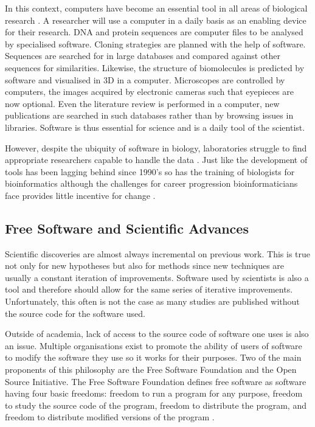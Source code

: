   In this context, computers have become an
  essential tool in all areas of biological research
  \citep{wren2016bioinformatics}.
  A researcher will use a computer in a daily
  basis as an enabling device for their research.
  DNA and protein sequences are computer files to be analysed by specialised
  software.  Cloning strategies are planned with the help of software.
  Sequences are searched for in large databases and compared against other
  sequences for similarities.
  Likewise, the structure of biomolecules is predicted by software and
  visualised in 3D in a computer.  Microscopes are controlled by
  computers, the images acquired by electronic cameras such that
  eyepieces are now optional.  Even
  the literature review is performed in a computer, new publications
  are searched in such databases rather than
  by browsing issues in libraries.  Software is
  thus essential for science and is a daily tool of the scientist.

  However, despite the ubiquity of software in biology, laboratories
  struggle to find appropriate researchers capable to handle the data
  \citep{lakhani2013prize}.  Just like the development of tools has
  been lagging behind since 1990's so has the training of biologists
  for bioinformatics \citep{altman1998curriculum} although the
  challenges for career progression bioinformaticians face provides
  little incentive for change \citep{wren2016bioinformatics}.

  \subsection{Free Software and Scientific Advances}

  Scientific discoveries are almost always incremental on previous work.
  This is true not only for new hypotheses but also
  for methods since new techniques are usually
  a constant iteration of improvements.  Software used by
  scientists is also a tool and therefore should allow for the same
  series of iterative improvements.
  Unfortunately, this often is not the case as
  many studies are published without the source code for the software used.

  Outside of academia, lack of access to the source code of software
  one uses is also an issue.
  Multiple organisations exist to promote the ability of users of software
  to modify the software they use so it works for their
  purposes.  Two of the main proponents of this philosophy
  are the Free Software Foundation and the
  Open Source Initiative.  The Free Software Foundation defines free
  software as software having four basic freedoms: freedom to run a
  program for any purpose, freedom to study the source code of the program,
  freedom to distribute the program,
  and freedom to distribute modified versions of the program
  \citep{fsf-what-is-free-software}.

